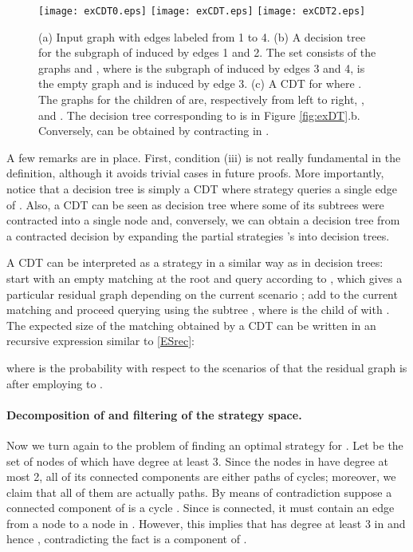 \documentclass[12pt]{article}
\begin{document}
	\begin{figure}
	\centering
		\texttt{[image: exCDT0.eps]} \hspace{45pt}
		\texttt{[image: exCDT.eps]} \hspace{45pt}
		\texttt{[image: exCDT2.eps]}
	\caption{(a) Input graph  with edges labeled from 1 to 4. (b) A decision tree  for the subgraph of  induced by edges 1 and 2. The set  consists of the graphs  and , where  is the subgraph of  induced by edges 3 and 4,  is the empty graph and  is induced by edge 3. (c) A CDT  for  where . The graphs  for the children of  are, respectively from left to right, ,  and . The decision tree corresponding to  is  in Figure \ref{fig:exDT}.b. Conversely,  can be obtained by contracting  in .}
	\label{fig:exCDT}
\end{figure}
	 
	 A few remarks are in place. First, condition (iii) is not really fundamental in the definition, although it avoids trivial cases in future proofs. More importantly, notice that a decision tree is simply a CDT where strategy  queries a single edge of . Also, a CDT can be seen as decision tree where some of its subtrees were contracted into a single node and, conversely, we can obtain a decision tree from a contracted decision by expanding the partial strategies 's into decision trees.
	
	A CDT  can be interpreted as a strategy in a similar way as in decision trees: start with an empty matching at the root  and query according to , which gives a particular residual graph  depending on the current scenario ; add  to the current matching and proceed querying using the subtree , where  is the child of  with . The expected size of the matching obtained by a CDT  can be written in an recursive expression similar to \eqref{ESrec}:

	where  is the probability with respect to the scenarios of  that the residual graph is  after employing  to .
	
	\paragraph{Decomposition of  and filtering of the strategy space.} Now we turn again to the problem of finding an optimal strategy for . Let  be the set of nodes of  which have degree at least 3. Since the nodes in  have degree at most 2, all of its connected components are either paths of cycles; moreover, we claim that all of them are actually paths. By means of contradiction suppose a connected component of  is a cycle . Since  is connected, it must contain an edge from a node  to a node in . However, this implies that  has degree at least 3 in  and hence , contradicting the fact  is a component of .	
	
\end{document}
